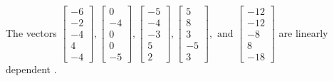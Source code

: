 \begin{exercise}
\begin{exerciseStatement}
  \end{exerciseStatement}
  \begin{exerciseAnswer}
   The vectors \(\left[\begin{array}{r}
-6 \\
-2 \\
-4 \\
4 \\
-4
\end{array}\right] , \left[\begin{array}{r}
0 \\
-4 \\
0 \\
0 \\
-5
\end{array}\right] , \left[\begin{array}{r}
-5 \\
-4 \\
-3 \\
5 \\
2
\end{array}\right] , \left[\begin{array}{r}
5 \\
8 \\
3 \\
-5 \\
3
\end{array}\right] , \text{ and } \left[\begin{array}{r}
-12 \\
-12 \\
-8 \\
8 \\
-18
\end{array}\right]\) are 
  	 linearly dependent  .
  


  \end{exerciseAnswer}
\end{exercise}